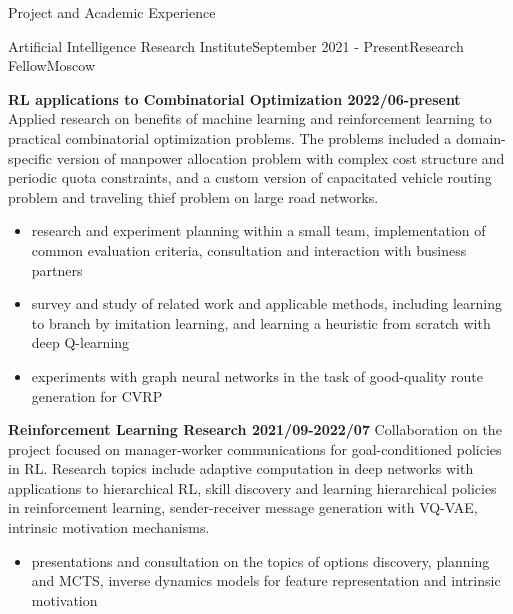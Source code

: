 \documentclass{resume} %
\begin{document}
\begin{rSection}{Project and Academic Experience}

\begin{rSubsection}{Artificial Intelligence Research Institute}{September 2021 - Present}{Research Fellow}{Moscow}
    \bigskip

    \item \textbf{RL applications to Combinatorial Optimization 2022/06-present}
    Applied research on benefits of machine learning and reinforcement learning to practical
    combinatorial optimization problems. The problems included a domain-specific version of manpower
    allocation problem with complex cost structure and periodic quota constraints, and a custom version
    of capacitated vehicle routing problem and traveling thief problem on large road networks.
    \begin{itemize}
        \item research and experiment planning within a small team, implementation of common
        evaluation criteria, consultation and interaction with business partners
        
        \item survey and study of related work and applicable methods, including learning to
        branch by imitation learning, and learning a heuristic from scratch with deep Q-learning
        
        \item experiments with graph neural networks in the task of good-quality route
        generation for CVRP
    \end{itemize}

    \medskip
    \item \textbf{Reinforcement Learning Research 2021/09-2022/07}
    Collaboration on the project focused on manager-worker communications for goal-conditioned
    policies in RL.
    Research topics include adaptive computation in deep networks with applications to
    hierarchical RL, skill discovery and learning hierarchical policies in reinforcement
    learning, sender-receiver message generation with VQ-VAE, intrinsic motivation mechanisms.
    \begin{itemize}
        \item presentations and consultation on the topics of options discovery, planning and
        MCTS, inverse dynamics models for feature representation and intrinsic motivation
        

\end{itemize}
\end{rSubsection}
\end{rSection}
\end{document}

